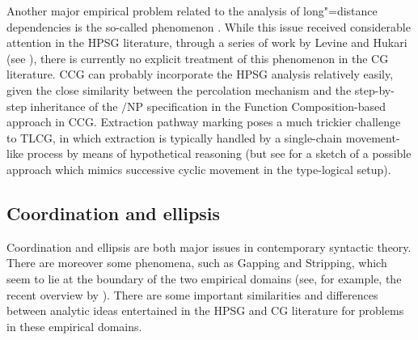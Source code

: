 \documentclass[output=paper
                ,modfonts
                ,nonflat
	        ,collection
	        ,collectionchapter
	        ,collectiontoclongg
 	        ,biblatex
                ,babelshorthands
                ,newtxmath
                ,draftmode
                ,colorlinks, citecolor=brown
]{./langsci/langscibook}
\begin{document}
Another major empirical problem related to the analysis of
long"=distance dependencies is the so-called  phenomenon \citep{mccloskey79,Zaenen83a-u}. While this issue
received considerable attention in the HPSG literature, through a
series of work by Levine and Hukari (see \citealt{LH2006a}), there is
currently no explicit treatment of this phenomenon in the CG
literature. CCG can probably incorporate the HPSG analysis relatively
easily, given the close similarity between the \slasch percolation
mechanism and the step-by-step inheritance of the $/$NP specification
in the Function Composition-based approach in CCG. Extraction pathway
marking poses a much trickier challenge to TLCG, in which extraction
is typically handled by a single-chain movement-like process by means
of hypothetical reasoning (but see \citealt[Chapter 7]{KubotaLevineBook}
for a sketch of a possible approach which mimics successive cyclic
movement in the type-logical setup).






\subsection{Coordination and ellipsis}

Coordination and ellipsis are both major issues in contemporary
syntactic theory. There are moreover some phenomena, such as Gapping
and Stripping, which seem to lie at the boundary of the two
empirical domains (see,  for example,  the recent overview
by \citealt{johnson-ellipsis-handbook}). There are some important similarities and
differences between analytic ideas entertained in the HPSG and CG
literature for problems in these empirical domains.
\end{document}
